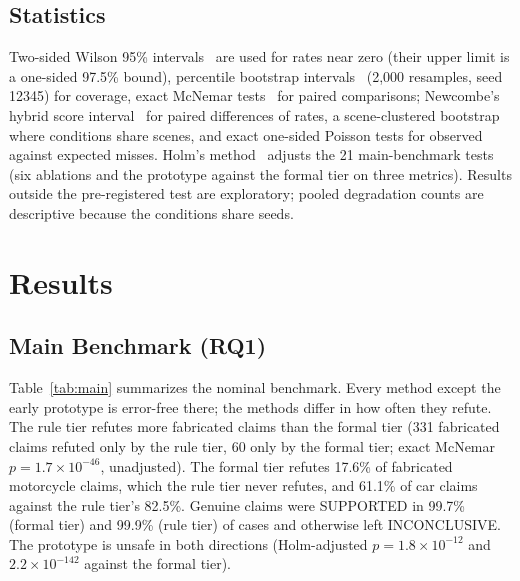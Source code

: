 \subsection{Statistics}
Two-sided Wilson 95\% intervals~\cite{b46} are used for rates near zero (their upper limit is a one-sided 97.5\% bound), percentile bootstrap intervals~\cite{b47} (2,000 resamples, seed 12345) for coverage, exact McNemar tests~\cite{b48} for paired comparisons; Newcombe's hybrid score interval~\cite{b61} for paired differences of rates, a scene-clustered bootstrap where conditions share scenes, and exact one-sided Poisson tests for observed against expected misses. Holm's method~\cite{b49} adjusts the 21 main-benchmark tests (six ablations and the prototype against the formal tier on three metrics). Results outside the pre-registered test are exploratory; pooled degradation counts are descriptive because the conditions share seeds.

\section{Results}\label{sec:results}

\subsection{Main Benchmark (RQ1)}
Table~\ref{tab:main} summarizes the nominal benchmark. Every method except the early prototype is error-free there; the methods differ in how often they refute. The rule tier refutes more fabricated claims than the formal tier (331 fabricated claims refuted only by the rule tier, 60 only by the formal tier; exact McNemar $p = 1.7 \times 10^{-46}$, unadjusted). The formal tier refutes 17.6\% of fabricated motorcycle claims, which the rule tier never refutes, and 61.1\% of car claims against the rule tier's 82.5\%. Genuine claims were SUPPORTED in 99.7\% (formal tier) and 99.9\% (rule tier) of cases and otherwise left INCONCLUSIVE. The prototype is unsafe in both directions (Holm-adjusted $p = 1.8 \times 10^{-12}$ and $2.2 \times 10^{-142}$ against the formal tier).

